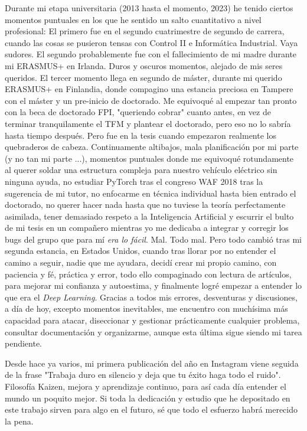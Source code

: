 Durante mi etapa universitaria (2013 hasta el momento, 2023) he tenido ciertos momentos puntuales en los que he sentido un salto cuantitativo a nivel profesional: El primero fue en el segundo cuatrimestre de segundo de carrera, cuando las cosas se pusieron tensas con Control II e Informática Industrial. Vaya sudores. El segundo probablemente fue con el fallecimiento de mi madre durante mi ERASMUS+ en Irlanda. Duros y oscuros momentos, alejado de mis seres queridos. El tercer momento llega en segundo de máster, durante mi querido ERASMUS+ en Finlandia, donde compagino una estancia preciosa en Tampere con el máster y un pre-inicio de doctorado. Me equivoqué al empezar tan pronto con la beca de doctorado FPI, "queriendo cobrar" cuanto antes, en vez de terminar tranquilamente el TFM y plantear el doctorado, pero eso no lo sabría hasta tiempo después. Pero fue en la tesis cuando empezaron realmente los quebraderos de cabeza. Continuamente altibajos, mala planificación por mi parte (y no tan mi parte ...), momentos puntuales donde me equivoqué rotundamente al querer soldar una estructura compleja para nuestro vehículo eléctrico sin ninguna ayuda, no estudiar PyTorch tras el congreso WAF 2018 tras la sugerencia de mi tutor, no enfocarme en técnica individual hasta bien entrado el doctorado, no querer hacer nada hasta que no tuviese la teoría perfectamente asimilada, tener demasiado respeto a la Inteligencia Artificial y escurrir el bulto de mi tesis en un compañero mientras yo me dedicaba a integrar y corregir los bugs del grupo que para mí \textit{era lo fácil}. Mal. Todo mal. Pero todo cambió tras mi segunda estancia, en Estados Unidos, cuando tras llorar por no entender el camino a seguir, nadie que me ayudara, decidí crear mi propio camino, con paciencia y fé, práctica y error, todo ello compaginado con lectura de artículos, para mejorar mi confianza y autoestima, y finalmente logré empezar a entender lo que era el \textit{Deep Learning}. Gracias a todos mis errores, desventuras y discusiones, a día de hoy, excepto momentos inevitables, me encuentro con muchísima más capacidad para atacar, diseccionar y gestionar prácticamente cualquier problema, consultar documentación y organizarme, aunque esta última sigue siendo mi tarea pendiente.

Desde hace ya varios, mi primera publicación del año en Instagram viene seguida de la frase "Trabaja duro en silencio y deja que tu éxito haga todo el ruido". Filosofía Kaizen, mejora y aprendizaje continuo, para así cada día entender el mundo un poquito mejor. Si toda la dedicación y estudio que he depositado en este trabajo sirven para algo en el futuro, sé que todo el esfuerzo habrá merecido la pena.

